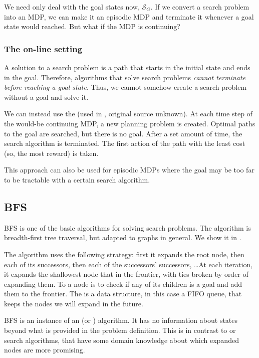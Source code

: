 We need only deal with the goal states now, $\mathcal{S}_G$. If we convert a
search problem into an \ac{MDP}, we can make it an episodic \ac{MDP} and
terminate it whenever a goal state would reached. But what if the \ac{MDP} is
continuing?


\subsubsection{The on-line setting\label{subsec:online-setting}}
A solution to a search problem is a path that starts in the initial state and
ends in the goal. Therefore, algorithms that solve search problems \emph{cannot
terminate before reaching a goal state}. Thus, we cannot somehow create a search
problem without a goal and solve it.

We can instead use the 
(used in \citet{lipovetzky2015classical}, original source unknown). At each time
step of the would-be continuing \ac{MDP}, a new planning problem is created.
Optimal paths to the goal are searched, but there is no goal. After a set amount
of time, the search algorithm is terminated. The first action of the path with
the least cost (so, the most reward) is taken.

This approach can also be used for episodic \acp{MDP} where the goal may be too
far to be tractable with a certain search algorithm.

\subsection{\acl{BFS}}
\acf{BFS} is one of the basic algorithms for solving search problems.
The algorithm is breadth-first tree traversal, but adapted to graphs
in general. We show it in .

The algorithm uses the following strategy: first it expands the root node, then
each of its successors, then each of the successors' successors, \dots At each
iteration, it expands the shallowest node that in the frontier, with ties broken
by order of expanding them. To  a node is to check if any of
its children is a goal and add them to the frontier. The 
is a data structure, in this case a \ac{FIFO} queue, that keeps the nodes we
will expand in the future.

\ac{BFS} is an instance of an  (or
) algorithm. It has no information about states beyond
what is provided in the problem definition. This is in contrast to
 or  search algorithms, that have
some domain knowledge about which expanded nodes are more promising.

